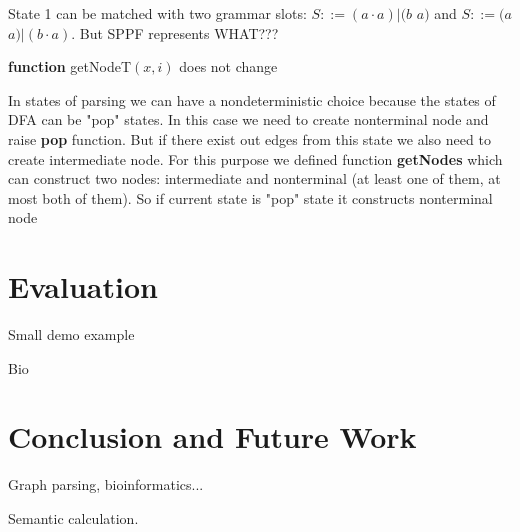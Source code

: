 \documentclass[runningheads,a4paper]{llncs}
\begin{document}
State 1 can be matched with two grammar slots: $S ::= (a \cdot a)|(b$ $a)$ and $S ::= (a$ $a)|(b \cdot a)$. But 
SPPF represents WHAT???




\textbf{function} getNodeT$(x,i)$ does not change

In states of parsing we can have a nondeterministic choice because the states of DFA can be "pop" states.
In this case we need to create nonterminal node and raise \textbf{pop} function. But if there exist out edges from this state we also need to create intermediate node.
For this purpose we defined function \textbf{getNodes} which can construct two nodes: intermediate and nonterminal (at least one of them, at most both of them).
So if current state is "pop" state it constructs nonterminal node








\section{Evaluation}

Small demo example

Bio



\section{Conclusion and Future Work}

Graph parsing, bioinformatics...

Semantic calculation.





\end{document}
